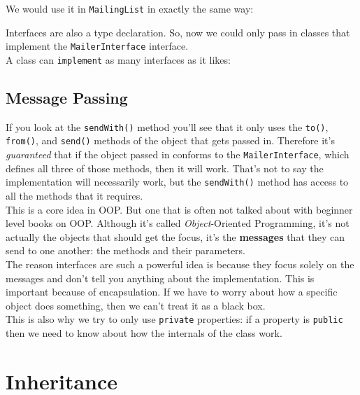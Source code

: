 
We would use it in \texttt{MailingList} in exactly the same way:


Interfaces are also a type declaration. So, now we could only pass in classes that implement the \texttt{MailerInterface} interface.
\\

A class can \texttt{implement} as many interfaces as it likes:



\subsection{Message Passing}

If you look at the \texttt{sendWith()} method you'll see that it only uses the \texttt{to()}, \texttt{from()}, and \texttt{send()} methods of the object that gets passed in. Therefore it's \textit{guaranteed} that if the object passed in conforms to the \texttt{MailerInterface}, which defines all three of those methods, then it will work. That's not to say the implementation will necessarily work, but the \texttt{sendWith()} method has access to all the methods that it requires.
\\

This is a core idea in OOP. But one that is often not talked about with beginner level books on OOP. Although it's called \textit{Object}-Oriented Programming, it's not actually the objects that should get the focus, it's the \textbf{messages} that they can send to one another: the methods and their parameters.
\\

The reason interfaces are such a powerful idea is because they focus solely on the messages and don't tell you anything about the implementation. This is important because of encapsulation. If we have to worry about how a specific object does something, then we can't treat it as a black box.
\\

This is also why we try to only use \texttt{private} properties: if a property is \texttt{public} then we need to know about how the internals of the class work.



\section{Inheritance}

